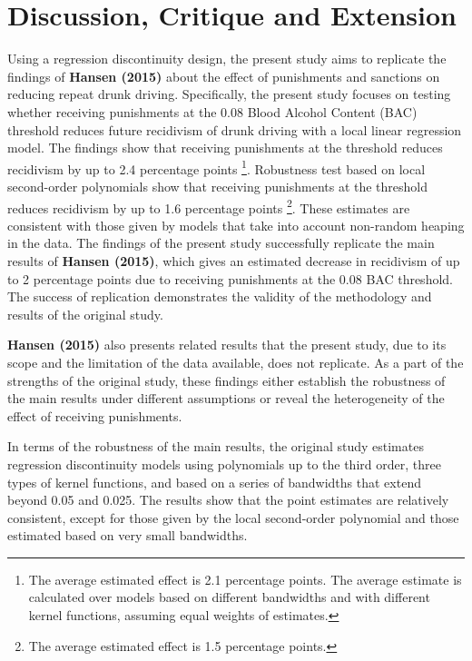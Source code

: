 \documentclass[
  11pt,
]{article}
\begin{document}
\endgroup

\hypertarget{discussion-critique-and-extension}{%
\section{Discussion, Critique and
Extension}\label{discussion-critique-and-extension}}

Using a regression discontinuity design, the present study aims to
replicate the findings of \textbf{Hansen (2015)} about the effect of
punishments and sanctions on reducing repeat drunk driving.
Specifically, the present study focuses on testing whether receiving
punishments at the 0.08 Blood Alcohol Content (BAC) threshold reduces
future recidivism of drunk driving with a local linear regression model.
The findings show that receiving punishments at the threshold reduces
recidivism by up to 2.4 percentage points
\footnote{The average estimated effect is 2.1 percentage points. The average estimate is calculated over models based on different bandwidths and with different kernel functions, assuming equal weights of estimates.}.
Robustness test based on local second-order polynomials show that
receiving punishments at the threshold reduces recidivism by up to 1.6
percentage points
\footnote{The average estimated effect is 1.5 percentage points.}. These
estimates are consistent with those given by models that take into
account non-random heaping in the data. The findings of the present
study successfully replicate the main results of \textbf{Hansen (2015)},
which gives an estimated decrease in recidivism of up to 2 percentage
points due to receiving punishments at the 0.08 BAC threshold. The
success of replication demonstrates the validity of the methodology and
results of the original study.

\textbf{Hansen (2015)} also presents related results that the present
study, due to its scope and the limitation of the data available, does
not replicate. As a part of the strengths of the original study, these
findings either establish the robustness of the main results under
different assumptions or reveal the heterogeneity of the effect of
receiving punishments.

In terms of the robustness of the main results, the original study
estimates regression discontinuity models using polynomials up to the
third order, three types of kernel functions, and based on a series of
bandwidths that extend beyond 0.05 and 0.025. The results show that the
point estimates are relatively consistent, except for those given by the
local second-order polynomial and those estimated based on very small
bandwidths.
\end{document}
